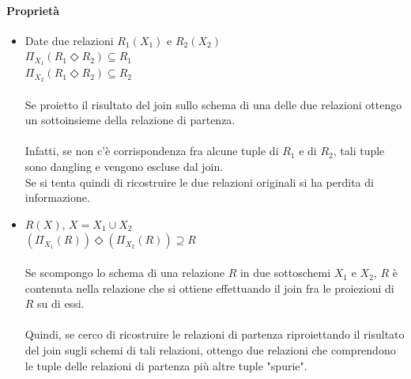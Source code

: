 \documentclass[../main.tex]{subfiles}
\begin{document}
	\paragraph{Proprietà}
	\begin{itemize}
		\item Date due relazioni $R_1(X_1)$ e $R_2(X_2)$\\
		$\Pi_{X_1} (R_1 \Diamond R_2) \subseteq R_1$\\
		$\Pi_{X_2} (R_1 \Diamond R_2) \subseteq R_2$\\\\
		Se proietto il risultato del join sullo schema di una delle due relazioni ottengo un sottoinsieme della relazione di partenza.\\\\
		Infatti, se non c’è corrispondenza fra alcune tuple di $R_1$ e di $R_2$, tali tuple sono dangling e vengono escluse dal join.\\
		Se si tenta quindi di ricostruire le due relazioni originali si ha perdita di informazione.
		\item $R(X)$, $X = X_1 \cup X_2$\\
		$(\Pi_{X_1} (R) ) \Diamond (\Pi_{X_2} (R) ) \supseteq R$\\\\
		Se scompongo lo schema di una relazione $R$ in due sottoschemi $X_1$ e $X_2$, $R$ è contenuta nella relazione che si ottiene effettuando il join fra le proiezioni di $R$ su di essi.\\\\
		Quindi, se cerco di ricostruire le relazioni di partenza riproiettando il risultato del join sugli schemi di tali relazioni, ottengo due relazioni che comprendono le tuple delle relazioni di partenza più altre tuple "spurie".
	\end{itemize}
\end{document}
